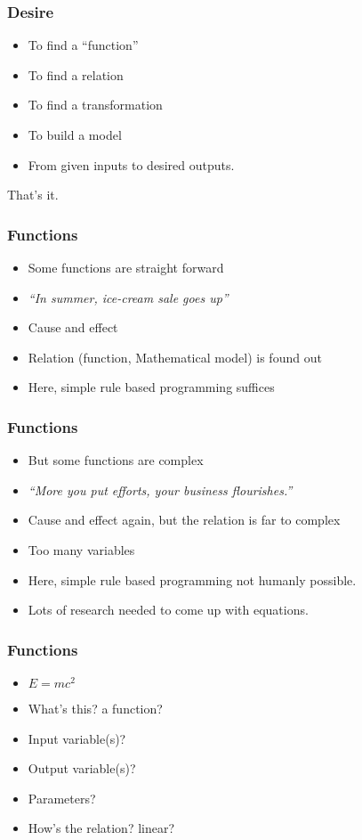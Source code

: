 \begin{frame}[fragile]\frametitle{Desire}
\begin{itemize}
\item To find a ``function''
\item To find a relation
\item To find a transformation
\item To build a model
\item From given inputs to desired outputs.
\end{itemize}
That's it.
\end{frame}

\begin{frame}[fragile]\frametitle{Functions}
\begin{itemize}
\item Some functions are straight forward
\item {\em ``In summer, ice-cream sale goes up''}
\item Cause and effect
\item Relation (function, Mathematical model) is found out
\item Here, simple rule based programming suffices
\end{itemize}
\end{frame}

\begin{frame}[fragile]\frametitle{Functions}
\begin{itemize}
\item But some functions are complex
\item {\em ``More you put efforts, your business flourishes.''}
\item Cause and effect again, but the relation is far to complex
\item Too many variables
\item Here, simple rule based programming not humanly possible.
\item Lots of research needed to come up with equations.
\end{itemize}
\end{frame}

\begin{frame}[fragile]\frametitle{Functions}
\begin{itemize}
\item $E = mc^2$
\item What's this? a function?
\item Input variable(s)?
\item Output variable(s)?
\item Parameters?
\item How's the relation? linear?
\end{itemize}
\end{frame}



